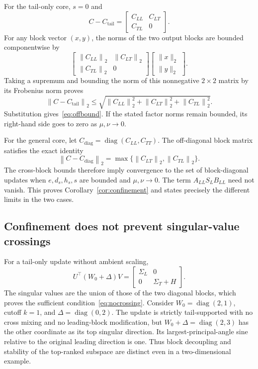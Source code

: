 \documentclass{article}
\newcommand{\diag}{\operatorname{diag}}
\newcommand{\op}[1]{\left\|#1\right\|_2}
\begin{document}
For the tail-only core, $s=0$ and
\begin{equation}
C-C_{\mathrm{tail}}=\begin{bmatrix}C_{LL}&C_{LT}\\C_{TL}&0\end{bmatrix}.
\end{equation}
For any block vector $(x,y)$, the norms of the two output blocks are bounded componentwise by
\begin{equation}
\begin{bmatrix}\op{C_{LL}}&\op{C_{LT}}\\\op{C_{TL}}&0\end{bmatrix}
\begin{bmatrix}\|x\|_2\\\|y\|_2\end{bmatrix}.
\end{equation}
Taking a supremum and bounding the norm of this nonnegative $2\times2$ matrix by its Frobenius norm proves
\begin{equation}
\op{C-C_{\mathrm{tail}}}
\le\sqrt{\op{C_{LL}}^2+\op{C_{LT}}^2+\op{C_{TL}}^2}.
\end{equation}
Substitution gives~\eqref{eq:offbound}. If the stated factor norms remain bounded, its right-hand side goes to zero as $\mu,\nu\to0$.

For the general core, let $C_{\mathrm{diag}}=\diag(C_{LL},C_{TT})$. The off-diagonal block matrix satisfies the exact identity
\begin{equation}
\op{C-C_{\mathrm{diag}}}=\max\{\op{C_{LT}},\op{C_{TL}}\}.
\end{equation}
The cross-block bounds therefore imply convergence to the set of block-diagonal updates when $e,d_s,h_s,s$ are bounded and $\mu,\nu\to0$. The term $A_{LL}S_LB_{LL}$ need not vanish. This proves Corollary~\ref{cor:confinement} and states precisely the different limits in the two cases.

\subsection{Confinement does not prevent singular-value crossings}
\label{app:crossing}
For a tail-only update without ambient scaling,
\begin{equation}
U^\top(W_0+\Delta)V=
\begin{bmatrix}\Sigma_L&0\\0&\Sigma_T+H\end{bmatrix}.
\end{equation}
The singular values are the union of those of the two diagonal blocks, which proves the sufficient condition~\eqref{eq:nocrossing}. Consider $W_0=\diag(2,1)$, cutoff $k=1$, and $\Delta=\diag(0,2)$. The update is strictly tail-supported with no cross mixing and no leading-block modification, but $W_0+\Delta=\diag(2,3)$ has the other coordinate as its top singular direction. Its largest-principal-angle sine relative to the original leading direction is one. Thus block decoupling and stability of the top-ranked subspace are distinct even in a two-dimensional example.
\end{document}
